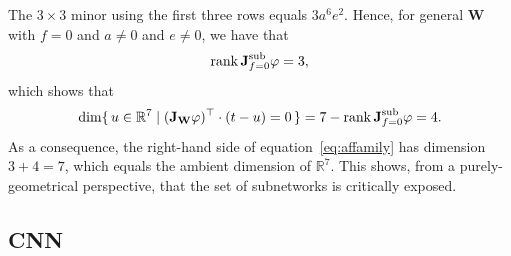 \documentclass{article} %
\def\eqref#1{equation~\ref{#1}}
\theoremstyle{plain}%
\theoremstyle{definition}
\theoremstyle{remark}
\newcommand{\jacob}{\textnormal{\textbf{J}}}
\begin{document}
The $3\times 3$ minor using the first three rows equals $3 a^6 e^2$. Hence, for
general $\mathbf{W}$ with $f=0$ and $a\neq 0$ and $e\neq 0$, we have that
\begin{equation}
\operatorname{rank} \jacob_{f=0}^{\mathrm{sub}}\varphi=3,
\end{equation}
which shows that
\begin{equation}
\dim\{\,u\in\mathbb{R}^7 \mid (\jacob_{\mathbf{W}} \varphi)^{\top} \cdot (t-u)=0\,\}
= 7-\operatorname{rank}\jacob_{f=0}^{\mathrm{sub}}\varphi=4.
\end{equation}
As a consequence, the right-hand side of \eqref{eq:affamily} has dimension $3 + 4 = 7$, which equals the ambient dimension of $\mathbb{R}^7$. This shows, from a purely-geometrical perspective, that the set of subnetworks is critically exposed.





\subsection{CNN}
\label{app:cnn}
\end{document}
